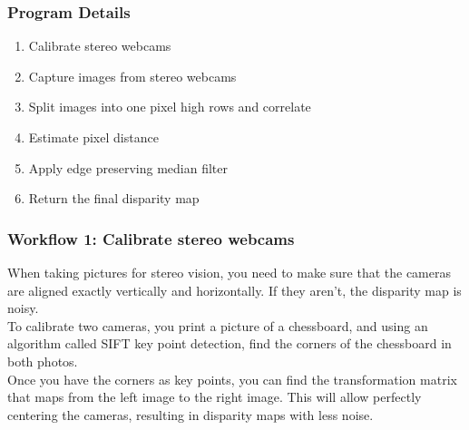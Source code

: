 \documentclass[19pt]{beamer}
\begin{document}
\begin{frame}
\frametitle{Program Details}
\begin{enumerate}
    \item Calibrate stereo webcams\\[15pt]
    \item Capture images from stereo webcams\\[15pt]
    \item Split images into one pixel high rows and correlate\\[15pt]
    \item Estimate pixel distance\\[15pt]
    \item Apply edge preserving median filter\\[15pt]
    \item Return the final disparity map 
\end{enumerate}
\end{frame}


\begin{frame}
\frametitle{Workflow 1: Calibrate stereo webcams}

When taking pictures for stereo vision, you need to make sure that the cameras are aligned exactly vertically and horizontally. If they aren't, the disparity map is noisy.\\[15pt]
%
To calibrate two cameras, you print a picture of a chessboard, and using an algorithm called SIFT key point detection, find the corners of the chessboard in both photos.\\[15pt]
%
Once you have the corners as key points, you can find the transformation matrix that maps from the left image to the right image. This will allow perfectly centering the cameras, resulting in  disparity maps with less noise.
\end{frame}
\end{document}
